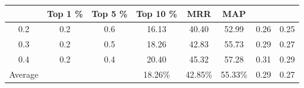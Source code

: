 \documentclass[conference]{IEEEtran}
\begin{document}
\begin{table}[htbp]
{\begin{tabular}{c|c|c|c|c|c|c|c}
				  & \textbf{Top 1} \% 
				  & \textbf{Top 5} \% & 
			\textbf{Top 10} \% &
			 \textbf{MRR}  & 
			 \textbf{MAP}  \\
			 \hline
			{0.2} 
			& 0.2 &0.6                                                                                                                                               & 16.13                                               & 40.40                                            & 52.99                                                &   0.26  & 0.25    \\ \hline
			{0.3} 
			& 0.2  &0.5                                                                    & 18.26                                               & 42.83                                              & 55.73                                             &   0.29  &   0.27  \\ 
			\hline
			
			{0.4}  & 0.2
			& 0.4
			&20.40 &
			45.32 &
			57.28 & 0.31 &
			0.29     \\  
			\hline
			{Average}      
			&                                                                              &                                           & 18.26\%                                                 & 42.85\%                                                 & 55.33\%                                                  &     0.29 &  0.27    \\ 
			\hline
\end{tabular}}
\centering
\end{table}
\end{document}
